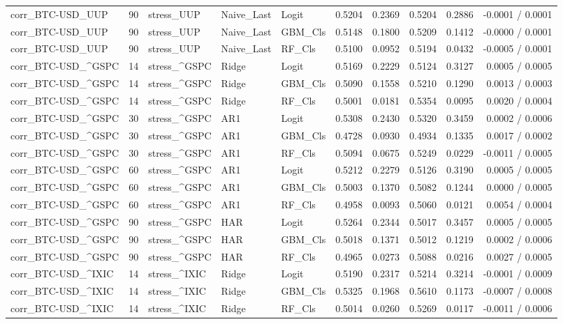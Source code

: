 \begin{table}[H]
\begin{tabular}{lllllrrrrr}
corr_BTC-USD_UUP & 90 & stress_UUP & Naive_Last & Logit & 0.5204 & 0.2369 & 0.5204 & 0.2886 & -0.0001 / 0.0001 \\
corr_BTC-USD_UUP & 90 & stress_UUP & Naive_Last & GBM_Cls & 0.5148 & 0.1800 & 0.5209 & 0.1412 & -0.0000 / 0.0001 \\
corr_BTC-USD_UUP & 90 & stress_UUP & Naive_Last & RF_Cls & 0.5100 & 0.0952 & 0.5194 & 0.0432 & -0.0005 / 0.0001 \\
corr_BTC-USD_^GSPC & 14 & stress_^GSPC & Ridge & Logit & 0.5169 & 0.2229 & 0.5124 & 0.3127 & 0.0005 / 0.0005 \\
corr_BTC-USD_^GSPC & 14 & stress_^GSPC & Ridge & GBM_Cls & 0.5090 & 0.1558 & 0.5210 & 0.1290 & 0.0013 / 0.0003 \\
corr_BTC-USD_^GSPC & 14 & stress_^GSPC & Ridge & RF_Cls & 0.5001 & 0.0181 & 0.5354 & 0.0095 & 0.0020 / 0.0004 \\
corr_BTC-USD_^GSPC & 30 & stress_^GSPC & AR1 & Logit & 0.5308 & 0.2430 & 0.5320 & 0.3459 & 0.0002 / 0.0006 \\
corr_BTC-USD_^GSPC & 30 & stress_^GSPC & AR1 & GBM_Cls & 0.4728 & 0.0930 & 0.4934 & 0.1335 & 0.0017 / 0.0002 \\
corr_BTC-USD_^GSPC & 30 & stress_^GSPC & AR1 & RF_Cls & 0.5094 & 0.0675 & 0.5249 & 0.0229 & -0.0011 / 0.0005 \\
corr_BTC-USD_^GSPC & 60 & stress_^GSPC & AR1 & Logit & 0.5212 & 0.2279 & 0.5126 & 0.3190 & 0.0005 / 0.0005 \\
corr_BTC-USD_^GSPC & 60 & stress_^GSPC & AR1 & GBM_Cls & 0.5003 & 0.1370 & 0.5082 & 0.1244 & 0.0000 / 0.0005 \\
corr_BTC-USD_^GSPC & 60 & stress_^GSPC & AR1 & RF_Cls & 0.4958 & 0.0093 & 0.5060 & 0.0121 & 0.0054 / 0.0004 \\
corr_BTC-USD_^GSPC & 90 & stress_^GSPC & HAR & Logit & 0.5264 & 0.2344 & 0.5017 & 0.3457 & 0.0005 / 0.0005 \\
corr_BTC-USD_^GSPC & 90 & stress_^GSPC & HAR & GBM_Cls & 0.5018 & 0.1371 & 0.5012 & 0.1219 & 0.0002 / 0.0006 \\
corr_BTC-USD_^GSPC & 90 & stress_^GSPC & HAR & RF_Cls & 0.4965 & 0.0273 & 0.5088 & 0.0216 & 0.0027 / 0.0005 \\
corr_BTC-USD_^IXIC & 14 & stress_^IXIC & Ridge & Logit & 0.5190 & 0.2317 & 0.5214 & 0.3214 & -0.0001 / 0.0009 \\
corr_BTC-USD_^IXIC & 14 & stress_^IXIC & Ridge & GBM_Cls & 0.5325 & 0.1968 & 0.5610 & 0.1173 & -0.0007 / 0.0008 \\
corr_BTC-USD_^IXIC & 14 & stress_^IXIC & Ridge & RF_Cls & 0.5014 & 0.0260 & 0.5269 & 0.0117 & -0.0011 / 0.0006 \\

\end{tabular}
\end{table}
